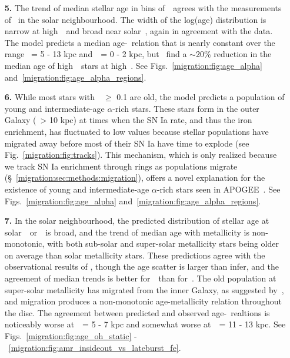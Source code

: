 \begin{enumerate}
	\item[\textbf{5.}] The trend of median stellar age in bins of~\ofe~agrees 
	with the measurements of~\citet{Feuillet2019} in the solar neighbourhood. 
	The width of the log(age) distribution is narrow at high~\ofe~and broad 
	near solar~\ofe, again in agreement with the data. The model predicts a 
	median age-\ofe~relation that is nearly constant over the range 
	\rgal~= 5 - 13 kpc and~\absz~= 0 - 2 kpc, but~\citet{Feuillet2019} find a 
	$\sim$20\% reduction in the median age of high~\ofe~stars at high~\absz. 
	See Figs.~\ref{migration:fig:age_alpha} and~\ref{migration:fig:age_alpha_regions}. 

	\item[\textbf{6.}] While most stars with~\ofe~$\geq$ 0.1 are old, the model 
	predicts a population of young and intermediate-age $\alpha$-rich stars. 
	These stars form in the outer Galaxy (\rgal~> 10 kpc) at times when the SN 
	Ia rate, and thus the iron enrichment, has fluctuated to low values because 
	stellar populations have migrated away before most of their SN Ia have time 
	to explode (see Fig.~\ref{migration:fig:tracks}). 
	This mechanism, which is only realized because we track SN Ia enrichment 
	through rings as populations migrate (\S~\ref{migration:sec:methods:migration}), 
	offers a novel explanation for the existence of young and intermediate-age 
	$\alpha$-rich stars seen in APOGEE~\citep{Chiappini2015, Martig2015, 
	Martig2016, Jofre2016, Yong2016, Izzard2018, SilvaAguirre2018, 
	Warfield2021}. 
	See Figs.~\ref{migration:fig:age_alpha} and~\ref{migration:fig:age_alpha_regions}. 

	\item[\textbf{7.}] In the solar neighbourhood, the predicted distribution 
	of stellar age at solar~\feh~or~\oh~is broad, and the trend of median age 
	with metallicity is non-monotonic, with both sub-solar and super-solar 
	metallicity stars being older on average than solar metallicity stars. 
	These predictions agree with the observational results of 
	\citet{Feuillet2019}, though the age scatter is larger than 
	\citet{Feuillet2019} infer, and the agreement of median trends is better 
	for~\oh~than for~\feh. 
	The old population at super-solar metallicity has migrated from the inner 
	Galaxy, as suggested by~\citet{Feuillet2018, Feuillet2019}, and migration 
	produces a non-monotonic age-metallicity relation throughout the disc. 
	The agreement between predicted and observed age-\feh~realtions is 
	noticeably worse at~\rgal~= 5 - 7 kpc and somewhat worse at~\rgal~= 11 - 13 
	kpc. 
	See Figs.~\ref{migration:fig:age_oh_static} -~\ref{migration:fig:amr_insideout_vs_lateburst_fe}. 


\end{enumerate}
